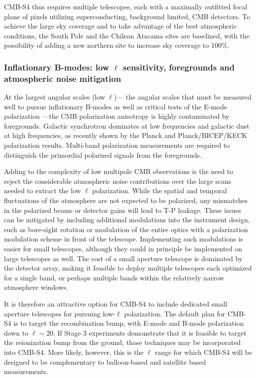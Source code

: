 CMB-S4 thus requires multiple telescopes, each with a maximally outfitted focal plane of pixels utilizing superconducting, background limited, CMB detectors. To achieve the large sky coverage and to take advantage of the best atmospheric conditions, the South Pole and the Chilean Atacama sites are baselined, with the possibility of adding a new northern site to increase sky coverage to 100\%. 

\subsubsection{Inflationary B-modes: low $\ell$ sensitivity, foregrounds and atmospheric noise mitigation}

At the largest angular scales (low $\ell$)--- the angular scales that must be measured well to pursue inflationary B-modes as well as critical tests of the E-mode polarization ---the CMB polarization anisotropy is highly contaminated by foregrounds. Galactic synchrotron dominates at low frequencies and galactic dust at high frequencies, as recently shown by the Planck and Planck/BICEP/KECK polarization results. Multi-band polarization measurements are required to distinguish the primordial polarized signals from the foregrounds. 

Adding to the complexity of low multipole CMB observations is the need to reject the considerable atmospheric noise contributions over the large scans needed to extract the low 
$\ell$ polarization. While the spatial and temporal fluctuations of the atmosphere are not expected to be polarized, any mismatches in the polarized beams or detector gains will lead to T-P leakage. These issues can be mitigated by including additional modulations into the instrument design, such as bore-sight rotation or modulation of the entire optics with a polarization modulation scheme in front of the telescope. Implementing such modulations is easier for small telescopes, although they could in principle be implemented on large telescopes as well. The cost of a small aperture telescope is dominated by the detector array, making it feasible to deploy multiple telescopes each optimized for a single band, or perhaps multiple bands within the relatively narrow atmosphere windows.

It is therefore an attractive option for CMB-S4 to include dedicated small aperture telescopes for pursuing low-$\ell$ polarization. The default plan for CMB-S4 is to target the recombination bump, with E-mode and B-mode polarization down to $\ell \sim 20$. If Stage 3 experiments demonstrate that it is feasible to target the reionization bump from the ground, those techniques may be incorporated into CMB-S4. More likely, however, this is the $\ell$ range for which CMB-S4 will be designed to be complementary to balloon-based and satellite based measurements. 

